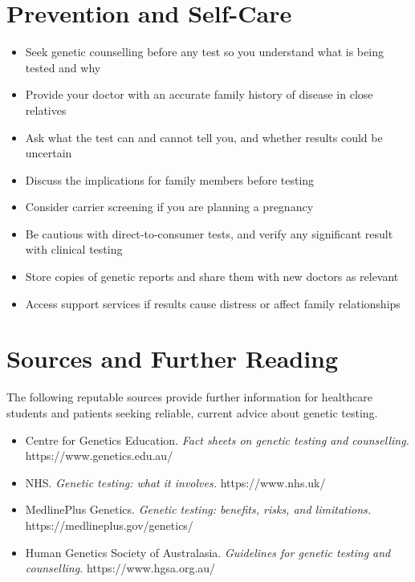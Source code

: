 \section*{Prevention and Self-Care}
\begin{itemize}
    \item Seek genetic counselling before any test so you understand what is being tested and why
    \item Provide your doctor with an accurate family history of disease in close relatives
    \item Ask what the test can and cannot tell you, and whether results could be uncertain
    \item Discuss the implications for family members before testing
    \item Consider carrier screening if you are planning a pregnancy
    \item Be cautious with direct-to-consumer tests, and verify any significant result with clinical testing
    \item Store copies of genetic reports and share them with new doctors as relevant
    \item Access support services if results cause distress or affect family relationships
\end{itemize}

\section*{Sources and Further Reading}
The following reputable sources provide further information for healthcare students and patients seeking reliable, current advice about genetic testing.

\begin{itemize}
    \item Centre for Genetics Education. \textit{Fact sheets on genetic testing and counselling.} https://www.genetics.edu.au/
    \item NHS. \textit{Genetic testing: what it involves.} https://www.nhs.uk/
    \item MedlinePlus Genetics. \textit{Genetic testing: benefits, risks, and limitations.} https://medlineplus.gov/genetics/
    \item Human Genetics Society of Australasia. \textit{Guidelines for genetic testing and counselling.} https://www.hgsa.org.au/
\end{itemize}
